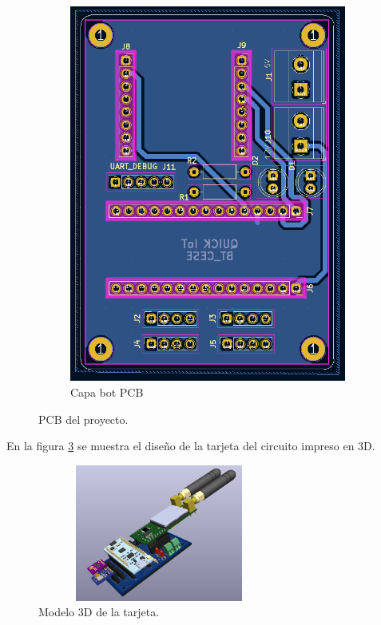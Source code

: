 \begin{figure}[h!]
\begin{subfigure}[b]{0.27\linewidth}
  \includegraphics[width=\linewidth]{./Figures/pcb_bot.png}
  \caption{Capa bot PCB}
  \label{fig:Capa bot PCB}
  \end{subfigure}
  \caption{PCB del proyecto.}
  \label{fig:PCB del proyecto}
\end{figure}

En la figura \ref{fig:3D del modulo} se muestra el diseño de la tarjeta del circuito impreso en 3D.
\begin{figure}[h!]
  \centering
	\includegraphics[width=8cm, height=4.5cm]{./Figures/tarjeta3d.png}
  \caption{Modelo 3D de la tarjeta.}
	\label{fig:3D del modulo}
\end{figure}
